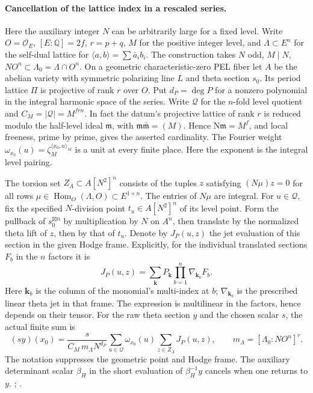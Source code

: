 \paragraph{Cancellation of the lattice index in a rescaled series.}
Here the auxiliary integer \(N\) can be arbitrarily large for a
fixed level. Write \(O=\mathcal O_E\), \([E:\mathbb Q]=2f\),
\(r=p+q\), \(M\) for the positive integer level, and
\(\Lambda\subset E^n\) for the self-dual lattice for
\(\langle a,b\rangle=\sum\bar a_i b_i\).
The construction takes \(N\) odd, \(M\mid N\),
\(NO^n\subset\Lambda_0=\Lambda\cap O^n\). On a geometric
characteristic-zero PEL fiber let \(A\) be the abelian variety with
symmetric polarizing line \(L\) and theta section \(s_0\).
Its period lattice \(\Pi\) is projective of rank \(r\) over \(O\).
Put \(d_P=\deg P\) for a nonzero polynomial in the integral harmonic
space of the series. Write \(\mathcal Q\) for the \(n\)-fold level
quotient and \(C_M=|\mathcal Q|=M^{frn}\). In fact the datum's
projective lattice of rank \(r\) is reduced modulo the half-level
ideal \(\mathfrak m\), with \(\mathfrak m\bar{\mathfrak m}=(M)\).
Hence \(\mathrm N\mathfrak m=M^f\), and local freeness, prime by
prime, gives the asserted cardinality. The Fourier weight
\(\omega_{x_0}(u)=\zeta_M^{\langle x_0,u\rangle_M}\) is a unit at
every finite place. Here the exponent is the integral level pairing.

The torsion set \(Z_\Lambda\subset A[N^2]^n\) consists of the
tuples \(z\) satisfying \((N\mu)z=0\) for all rows
\(\mu\in\operatorname{Hom}_O(\Lambda,O)\subset E^{1\times n}\).
The entries of \(N\mu\) are integral. For \(u\in\mathcal Q\), fix the
specified \(N\)-division point \(t_u\in A[N^2]^n\) of its level
point. Form the pullback of \(s_0^{\boxtimes n}\) by multiplication
by \(N\) on \(A^n\), then translate by the normalized theta lift of
\(z\), then by that of \(t_u\). Denote by \(J_P(u,z)\) the jet
evaluation of this section in the given Hodge frame. Explicitly,
for the individual translated sections \(F_b\) in the \(n\) factors
it is
\[
 J_P(u,z)=\sum_{\mathbf k} P_{\mathbf k}
       \prod_{b=1}^{n}\nabla_{\mathbf k_b}F_b .
\]
Here \(\mathbf k_b\) is the column of the monomial's multi-index at
\(b\); \(\nabla_{\mathbf k_b}\) is the prescribed linear theta
jet in that frame. The expression is multilinear in the factors,
hence depends on their tensor. For the raw theta section \(y\)
and the chosen scalar \(s\), the actual finite sum is
\[
 (s y)(x_0)=\frac{s}{C_M\,m_\Lambda N^{d_P}}
     \sum_{u\in\mathcal Q}\omega_{x_0}(u)
                      \sum_{z\in Z_\Lambda}J_P(u,z),\qquad
 m_\Lambda=[\Lambda_0:NO^n]^r .
\]
The notation suppresses the geometric point and Hodge frame. The
auxiliary determinant scalar \(\beta_H\) in the short evaluation
of \(\beta_H^{-1}y\) cancels when one returns to \(y\).
;
.


